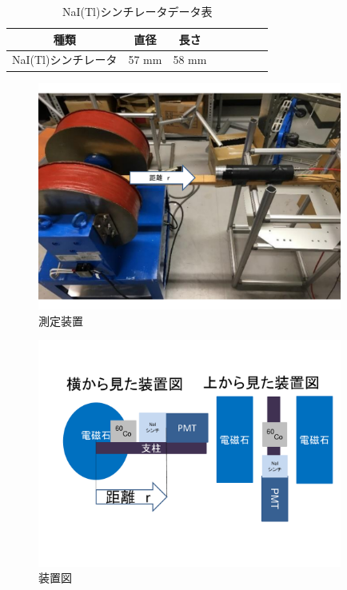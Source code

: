 \begin{table}[htb]
	\centering
	
	  \begin{tabular}{cccccccc} \hline
		種類& 直径 & 長さ  \\ \hline \hline
		NaI(Tl)シンチレータ & 57 mm & 58 mm \\ \hline
	\end{tabular}
	  \caption{NaI(Tl)シンチレータデータ表}
\end{table}

\begin{figure}[H]
	\centering
		\includegraphics[width=10cm]{fig/iguchi/2inchsokutei.pdf}
	\caption{測定装置}
	\label{2inchsokutei}
\end{figure}

\begin{figure}[H]
	\centering
		\includegraphics[width=10cm]{fig/iguchi/soutizu1.pdf}
	\caption{装置図}
	\label{soutizu1}
\end{figure}

